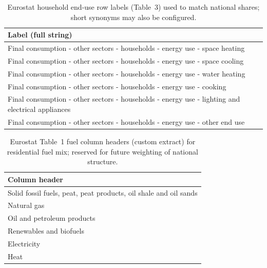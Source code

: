 \begin{table}[htbp]
  \centering
  \caption{Eurostat household end-use row labels (Table~3) used to match
    national shares; short synonyms may also be configured.}
  \label{tab:rescom_eurostat_table3}
  \footnotesize
  \begin{tabular}{@{}p{}@{}}
    \hline
    Label (full string) \\
    \hline
    Final consumption - other sectors - households - energy use - space heating \\
    Final consumption - other sectors - households - energy use - space cooling \\
    Final consumption - other sectors - households - energy use - water heating \\
    Final consumption - other sectors - households - energy use - cooking \\
    Final consumption - other sectors - households - energy use - lighting and electrical appliances \\
    Final consumption - other sectors - households - energy use - other end use \\
    \hline
  \end{tabular}
\end{table}

\begin{table}[htbp]
  \centering
  \caption{Eurostat Table~1 fuel column headers (custom extract) for
    residential fuel mix; reserved for future weighting of national structure.}
  \label{tab:rescom_eurostat_table1}
  \footnotesize
  \begin{tabular}{@{}p{}@{}}
    \hline
    Column header \\
    \hline
    Solid fossil fuels, peat, peat products, oil shale and oil sands \\
    Natural gas \\
    Oil and petroleum products \\
    Renewables and biofuels \\
    Electricity \\
    Heat \\
    \hline
  \end{tabular}
\end{table}

